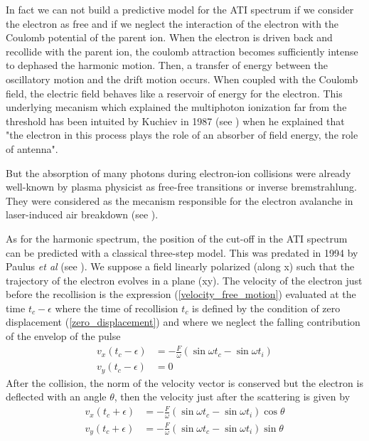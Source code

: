 \documentclass[a4paper]{article}
\begin{document}
\par
In fact we can not build a predictive model for the ATI spectrum if we consider the electron as free and if we neglect the interaction of the electron with the Coulomb potential of the parent ion. When the electron is driven back and recollide with the parent ion, the coulomb attraction becomes sufficiently intense to dephased the harmonic motion. Then, a transfer of energy between the oscillatory motion and the drift motion occurs. When coupled with the Coulomb field, the electric field behaves like a reservoir of energy for the electron. This underlying mecanism which explained the multiphoton ionization far from the threshold has been intuited by Kuchiev in 1987 (see \cite{Kuchiev_1987}) when he explained that "the electron in this process plays the role of an absorber of field energy, the role of antenna". 
\par
But the absorption of many photons during electron-ion collisions were already well-known by plasma physicist as free-free transitions or inverse bremstrahlung. They were considered as the mecanism responsible for the electron avalanche in laser-induced air breakdown (see \cite{Chin_2004}).
\par
As for the harmonic spectrum, the position of the cut-off in the ATI spectrum can be predicted with a classical three-step model. This was predated in 1994 by Paulus \textit{et al} (see \cite{Paulus_1994}). We suppose a field linearly polarized (along x) such that the trajectory of the electron evolves in a plane (xy). The velocity of the electron just before the recollision is the expression (\ref{velocity_free_motion}) evaluated at the time $t_{c}-\epsilon$ where the time of recollision $t_{c}$ is defined by the condition of zero displacement (\ref{zero_displacement}) and where we neglect the falling contribution of the envelop of the pulse
\begin{align}
v_{x}(t_{c}-\epsilon)&=-\frac{F}{\omega} \left( \sin{\omega t_{c}} - \sin{\omega t_{i}} \right) \\
v_{y}(t_{c}-\epsilon)&=0
\end{align}
After the collision, the norm of the velocity vector is conserved but the electron is deflected with an angle $\theta$, then the velocity just after the scattering is given by
\begin{align}
v_{x}(t_{c}+\epsilon)&=-\frac{F}{\omega} \left( \sin{\omega t_{c}} - \sin{\omega t_{i}} \right) \cos{\theta} \\
v_{y}(t_{c}+\epsilon)&=-\frac{F}{\omega} \left( \sin{\omega t_{c}} - \sin{\omega t_{i}} \right) \sin{\theta}
\end{align}
\end{document}
